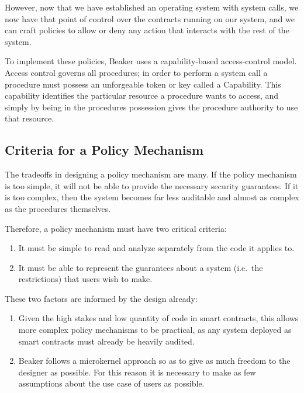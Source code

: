 \documentclass[english,a4paper]{article}
\begin{document}
However, now that we have established an operating system with system
calls, we now have that point of control over the contracts running on
our system, and we can craft policies to allow or deny any action that
interacts with the rest of the system.

To implement these policies, Beaker uses a capability-based
access-control model. Access control governs all procedures; in order to
perform a system call a procedure must possess an unforgeable token or
key called a Capability. This capability identifies the particular
resource a procedure wants to access, and simply by being in the
procedures possession gives the procedure authority to use that
resource.

\subsection{Criteria for a Policy
Mechanism}\label{criteria-for-a-policy-mechanism}
The tradeoffs in designing a policy mechanism are many. If the policy
mechanism is too simple, it will not be able to provide the necessary
security guarantees. If it is too complex, then the system becomes far
less auditable and almost as complex as the procedures themselves.

Therefore, a policy mechanism must have two critical criteria:

\begin{enumerate}
\def\labelenumi{\arabic{enumi}.}
\item
  It must be simple to read and analyze separately from the code it
  applies to.
\item
  It must be able to represent the guarantees about a system (i.e.~the
  restrictions) that users wish to make.
\end{enumerate}

These two factors are informed by the design already:

\begin{enumerate}
\def\labelenumi{\arabic{enumi}.}
\item
  Given the high stakes and low quantity of code in smart contracts,
  this allows more complex policy mechanisms to be practical, as any
  system deployed as smart contracts must already be heavily audited.
\item
  Beaker follows a microkernel approach so as to give as much freedom to
  the designer as possible. For this reason it is necessary to make as
  few assumptions about the use case of users as possible.
\end{enumerate}
\end{document}
